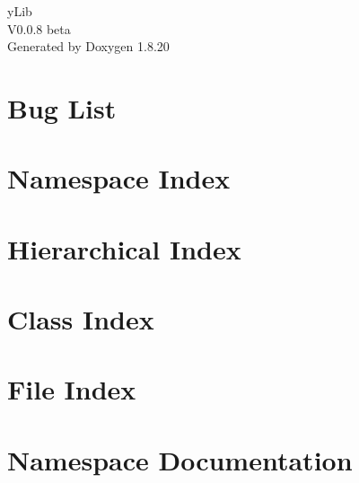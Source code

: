 \let\mypdfximage\pdfximage\def\pdfximage{\immediate\mypdfximage}\documentclass[twoside]{book}
\newcommand{\+}{\discretionary{\mbox{\scriptsize$\hookleftarrow$}}{}{}}
\newcommand{\clearemptydoublepage}{%
  \newpage{\pagestyle{empty}\cleardoublepage}%
}
\begin{document}
\hypersetup{pageanchor=false,
             bookmarksnumbered=true,
             pdfencoding=unicode
            }
\begin{titlepage}
\vspace*{7cm}
\begin{center}%
{\Large y\+Lib \\[1ex]\large V0.\+0.\+8 beta }\\
\vspace*{1cm}
{\large Generated by Doxygen 1.8.20}\\
\end{center}
\end{titlepage}
\clearemptydoublepage
{}
\tableofcontents
\clearemptydoublepage
{}
\hypersetup{pageanchor=true}

\chapter{Bug List}
\label{bug}

\chapter{Namespace Index}

\chapter{Hierarchical Index}

\chapter{Class Index}

\chapter{File Index}

\chapter{Namespace Documentation}




\end{document}
